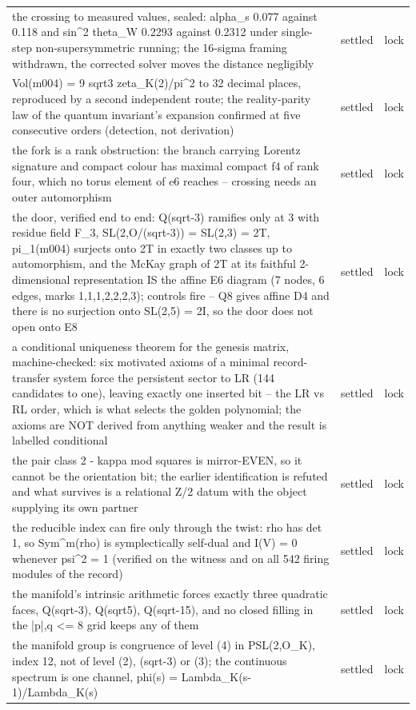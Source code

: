 \documentclass[11pt,a4paper]{article}
\theoremstyle{definition}
\theoremstyle{remark}
\begin{document}
\begin{longtable}{@{}p{9.2cm}p{2.9cm}p{2.0cm}@{}}
the crossing to measured values, sealed: alpha\_s 0.077 against 0.118 and sin\^{}2 theta\_W 0.2293 against 0.2312 under single-step non-supersymmetric running; the 16-sigma framing withdrawn, the corrected solver moves the distance negligibly & settled & lock \\
Vol(m004) = 9 sqrt3 zeta\_K(2)/pi\^{}2 to 32 decimal places, reproduced by a second independent route; the reality-parity law of the quantum invariant's expansion confirmed at five consecutive orders (detection, not derivation) & settled & lock \\
the fork is a rank obstruction: the branch carrying Lorentz signature and compact colour has maximal compact f4 of rank four, which no torus element of e6 reaches -- crossing needs an outer automorphism & settled & lock \\
the door, verified end to end: Q(sqrt-3) ramifies only at 3 with residue field F\_3, SL(2,O/(sqrt-3)) = SL(2,3) = 2T, pi\_1(m004) surjects onto 2T in exactly two classes up to automorphism, and the McKay graph of 2T at its faithful 2-dimensional representation IS the affine E6 diagram (7 nodes, 6 edges, marks 1,1,1,2,2,2,3); controls fire -- Q8 gives affine D4 and there is no surjection onto SL(2,5) = 2I, so the door does not open onto E8 & settled & lock \\
a conditional uniqueness theorem for the genesis matrix, machine-checked: six motivated axioms of a minimal record-transfer system force the persistent sector to LR (144 candidates to one), leaving exactly one inserted bit -- the LR vs RL order, which is what selects the golden polynomial; the axioms are NOT derived from anything weaker and the result is labelled conditional & settled & lock \\
the pair class 2 - kappa mod squares is mirror-EVEN, so it cannot be the orientation bit; the earlier identification is refuted and what survives is a relational Z/2 datum with the object supplying its own partner & settled & lock \\
the reducible index can fire only through the twist: rho has det 1, so Sym\^{}m(rho) is symplectically self-dual and I(V) = 0 whenever psi\^{}2 = 1 (verified on the witness and on all 542 firing modules of the record) & settled & lock \\
the manifold's intrinsic arithmetic forces exactly three quadratic faces, Q(sqrt-3), Q(sqrt5), Q(sqrt-15), and no closed filling in the |p|,q <= 8 grid keeps any of them & settled & lock \\
the manifold group is congruence of level (4) in PSL(2,O\_K), index 12, not of level (2), (sqrt-3) or (3); the continuous spectrum is one channel, phi(s) = Lambda\_K(s-1)/Lambda\_K(s) & settled & lock \\

\end{longtable}
\end{document}
